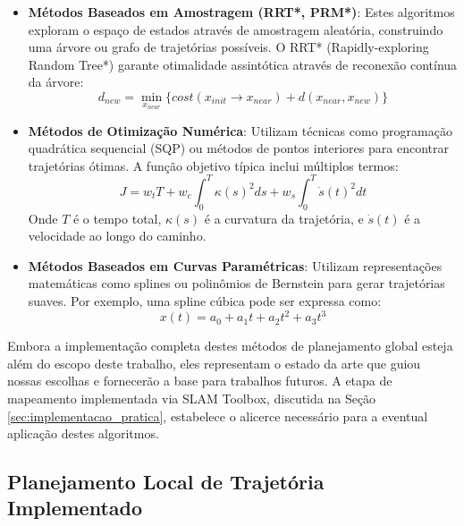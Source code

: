 \begin{itemize}
    \item \textbf{Métodos Baseados em Amostragem (RRT*, PRM*)}: Estes algoritmos exploram o espaço de estados através de amostragem aleatória, construindo uma árvore ou grafo de trajetórias possíveis. O RRT* (Rapidly-exploring Random Tree*) garante otimalidade assintótica através de reconexão contínua da árvore:
          \begin{equation}
              d_{new} = \min_{x_{near}} \{cost(x_{init} \rightarrow x_{near}) + d(x_{near}, x_{new})\}
              \label{eq:rrt_star_cost}
          \end{equation}

    \item \textbf{Métodos de Otimização Numérica}: Utilizam técnicas como programação quadrática sequencial (SQP) ou métodos de pontos interiores para encontrar trajetórias ótimas. A função objetivo típica inclui múltiplos termos:
          \begin{equation}
              J = w_t T + w_c \int_0^T \kappa(s)^2 ds + w_s \int_0^T \dot{s}(t)^2 dt
              \label{eq:trajectory_objective}
          \end{equation}
          Onde $T$ é o tempo total, $\kappa(s)$ é a curvatura da trajetória, e $\dot{s}(t)$ é a velocidade ao longo do caminho.

    \item \textbf{Métodos Baseados em Curvas Paramétricas}: Utilizam representações matemáticas como splines ou polinômios de Bernstein para gerar trajetórias suaves. Por exemplo, uma spline cúbica pode ser expressa como:
          \begin{equation}
              x(t) = a_0 + a_1t + a_2t^2 + a_3t^3
              \label{eq:cubic_spline}
          \end{equation}
\end{itemize}

Embora a implementação completa destes métodos de planejamento global esteja
além do escopo deste trabalho, eles representam o estado da arte que guiou
nossas escolhas e fornecerão a base para trabalhos futuros. A etapa de
mapeamento implementada via SLAM Toolbox, discutida na Seção
\ref{sec:implementacao_pratica}, estabelece o alicerce necessário para a
eventual aplicação destes algoritmos.

\subsection{Planejamento Local de Trajetória Implementado}

